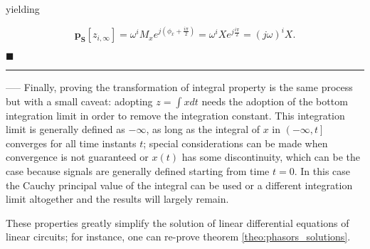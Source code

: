 	\noindent yielding

\begin{equation} \mathbf{p_S}\left[z_{i,\infty}\right] = \omega^i M_x e^{j\left(\phi_x + \frac{i\pi}{2}\right)} = \omega^i Xe^{j\frac{i\pi}{2}} = \left(j\omega\right)^i X . \end{equation}

\hfill$\blacksquare$
\vspace{5mm}
\hrule
\vspace{5mm}

	----- Finally, proving the transformation of integral property is the same process but with a small caveat: adopting $z = \int x dt$ needs the adoption of the bottom integration limit in order to remove the integration constant. This integration limit is generally defined as $-\infty$, as long as the integral of $x$ in $\left(-\infty,t\right]$ converges for all time instants $t$; special considerations can be made when convergence is not guaranteed or $x(t)$ has some discontinuity, which can be the case because signals are generally defined starting from time $t = 0$. In this case the Cauchy principal value of the integral can be used or a different integration limit altogether and the results will largely remain.

	These properties greatly simplify the solution of linear differential equations of linear circuits; for instance, one can re-prove theorem \ref{theo:phasors_solutions}.

